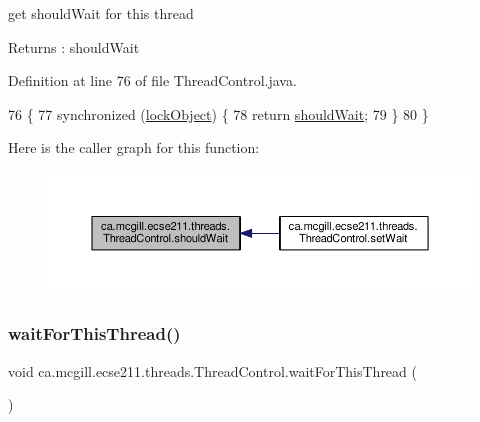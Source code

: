 get should\+Wait for this thread

\begin{DoxyReturn}{Returns}
\+: should\+Wait 
\end{DoxyReturn}


Definition at line 76 of file Thread\+Control.\+java.


\begin{DoxyCode}
76                               \{
77     \textcolor{keyword}{synchronized} (\hyperlink{classca_1_1mcgill_1_1ecse211_1_1threads_1_1_thread_control_ab20c44ff2dafab8981c42fa8bf634dfc}{lockObject}) \{
78       \textcolor{keywordflow}{return} \hyperlink{classca_1_1mcgill_1_1ecse211_1_1threads_1_1_thread_control_a9c3896500e86e402b8019e1be6500621}{shouldWait};
79     \}
80   \}
\end{DoxyCode}
Here is the caller graph for this function\+:\nopagebreak
\begin{figure}[H]
\begin{center}
\leavevmode
\includegraphics[width=350pt]{classca_1_1mcgill_1_1ecse211_1_1threads_1_1_thread_control_a9c3896500e86e402b8019e1be6500621_icgraph}
\end{center}
\end{figure}
\mbox{\label{classca_1_1mcgill_1_1ecse211_1_1threads_1_1_thread_control_a6a25ccb2d8916b8e6cc4b3bb0e9d2ed7}} 
\subsubsection{\texorpdfstring{wait\+For\+This\+Thread()}{waitForThisThread()}}
{\footnotesize\ttfamily void ca.\+mcgill.\+ecse211.\+threads.\+Thread\+Control.\+wait\+For\+This\+Thread (\begin{DoxyParamCaption}{ }\end{DoxyParamCaption})}

